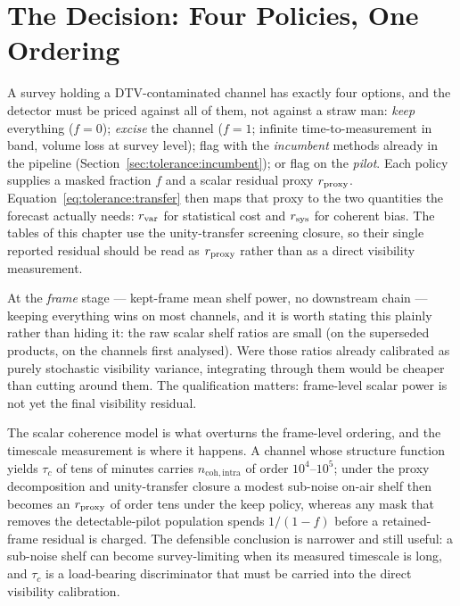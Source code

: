 \section{The Decision: Four Policies, One Ordering}
\label{sec:tolerance:policy}

A survey holding a DTV-contaminated channel has exactly four options, and the detector must be priced against all of them, not against a straw man: \emph{keep} everything ($f = 0$); \emph{excise} the channel ($f = 1$; infinite time-to-measurement in band, volume loss at survey level); flag with the \emph{incumbent} methods already in the pipeline (Section~\ref{sec:tolerance:incumbent}); or flag on the \emph{pilot}. Each policy supplies a masked fraction $f$ and a scalar residual proxy $r_{\rm proxy}$.  Equation~\eqref{eq:tolerance:transfer} then maps that proxy to the two quantities the forecast actually needs: $r_{\rm var}$ for statistical cost and $r_{\rm sys}$ for coherent bias.  The tables of this chapter use the unity-transfer screening closure, so their single reported residual should be read as $r_{\rm proxy}$ rather than as a direct visibility measurement.

At the \emph{frame} stage --- kept-frame mean shelf power, no downstream chain --- keeping everything wins on most channels, and it is worth stating this plainly rather than hiding it: the raw scalar shelf ratios are small (on the superseded products,  on the channels first analysed).  Were those ratios already calibrated as purely stochastic visibility variance, integrating through them would be cheaper than cutting around them.  The qualification matters: frame-level scalar power is not yet the final visibility residual.

The scalar coherence model is what overturns the frame-level ordering, and the timescale measurement is where it happens.  A channel whose structure function yields $\tau_c$ of tens of minutes carries $n_{\mathrm{coh,intra}}$ of order $10^4$--$10^5$; under the proxy decomposition and unity-transfer closure a modest sub-noise on-air shelf then becomes an $r_{\rm proxy}$ of order tens under the keep policy, whereas any mask that removes the detectable-pilot population spends $1/(1-f)$ before a retained-frame residual is charged.  The defensible conclusion is narrower and still useful: a sub-noise shelf can become survey-limiting when its measured timescale is long, and $\tau_c$ is a load-bearing discriminator that must be carried into the direct visibility calibration.

